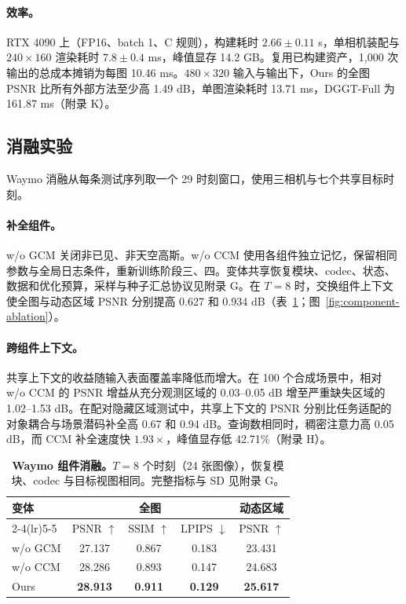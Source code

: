 \paragraph{效率。}
RTX 4090 上（FP16、batch 1、C 规则），构建耗时 $2.66\pm0.11$ s，单相机装配与 $240\times160$ 渲染耗时 $7.8\pm0.4$ ms，峰值显存 14.2 GB。复用已构建资产，1,000 次输出的总成本摊销为每图 10.46 ms。$480\times320$ 输入与输出下，Ours 的全图 PSNR 比所有外部方法至少高 1.49 dB，单图渲染耗时 13.71 ms，DGGT-Full 为 161.87 ms（附录 K）。

\subsection{消融实验}
\label{sec:ablation-protocol}\label{sec:ablations}\label{sec:ablation-studies}
Waymo 消融从每条测试序列取一个 29 时刻窗口，使用三相机与七个共享目标时刻。

\paragraph{补全组件。}
w/o GCM 关闭非已见、非天空高斯。w/o CCM 使用各组件独立记忆，保留相同参数与全局日志条件，重新训练阶段三、四。变体共享恢复模块、codec、状态、数据和优化预算，采样与种子汇总协议见附录 G。在 $T=8$ 时，交换组件上下文使全图与动态区域 PSNR 分别提高 0.627 和 0.934 dB（表~\ref{tab:ablation-components}；图~\ref{fig:component-ablation}）。

\paragraph{跨组件上下文。}
共享上下文的收益随输入表面覆盖率降低而增大。在 100 个合成场景中，相对 w/o CCM 的 PSNR 增益从充分观测区域的 0.03--0.05 dB 增至严重缺失区域的 1.02--1.53 dB。在配对隐藏区域测试中，共享上下文的 PSNR 分别比任务适配的对象耦合与场景潜码补全高 0.67 和 0.94 dB。查询数相同时，稠密注意力高 0.05 dB，而 CCM 补全速度快 $1.93\times$，峰值显存低 42.71\%（附录 H）。

\begin{table}[!htbp]
  \centering\small
  \caption{\textbf{Waymo 组件消融。}$T=8$ 个时刻（24 张图像），恢复模块、codec 与目标视图相同。完整指标与 SD 见附录 G。}
  \label{tab:ablation-components}
  \setlength{\tabcolsep}{3pt}
  \renewcommand{\arraystretch}{1.12}
  \begin{tabular*}{\linewidth}{@{\extracolsep{\fill}}lcccc@{}}
    \toprule
    \multirow{2}{*}{变体} & \multicolumn{3}{c}{全图} & 动态区域 \\
    \cmidrule(lr){2-4}\cmidrule(lr){5-5}
      & PSNR $\uparrow$ & SSIM $\uparrow$ & LPIPS $\downarrow$ & PSNR $\uparrow$ \\
    \midrule
    w/o GCM & 27.137 & 0.867 & 0.183 & 23.431 \\
    w/o CCM & 28.286 & 0.893 & 0.147 & 24.683 \\
    \midrule
    Ours & \textbf{28.913} & \textbf{0.911} & \textbf{0.129} & \textbf{25.617} \\
    \bottomrule
  \end{tabular*}
\end{table}

